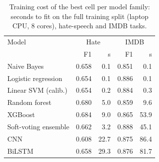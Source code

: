\begin{table}[t]
\centering
\caption{Training cost of the best cell per model family: seconds to fit on the full training split (laptop CPU, 8 cores), hate-speech and IMDB tasks.}
\label{tab:cost}
\begin{tabular}{lrrrr}
\toprule
Model & \multicolumn{2}{c}{Hate} & \multicolumn{2}{c}{IMDB} \\
 & F1 & s & F1 & s \\
\midrule
Naive Bayes & 0.658 & 0.1 & 0.851 & 0.1 \\
Logistic regression & 0.654 & 0.1 & 0.886 & 0.1 \\
Linear SVM (calib.) & 0.654 & 0.2 & 0.884 & 0.3 \\
Random forest & 0.680 & 5.0 & 0.859 & 9.6 \\
XGBoost & 0.684 & 9.0 & 0.865 & 53.9 \\
Soft-voting ensemble & 0.662 & 3.2 & 0.888 & 45.1 \\
CNN & 0.608 & 22.7 & 0.875 & 86.4 \\
BiLSTM & 0.658 & 29.3 & 0.876 & 81.7 \\
\bottomrule
\end{tabular}
\end{table}